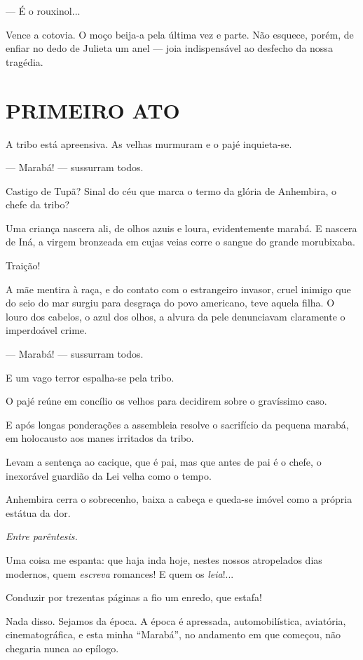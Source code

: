 --- É o rouxinol...

Vence a cotovia. O moço beija-a pela última vez e parte. Não esquece,
porém, de enfiar no dedo de Julieta um anel --- joia indispensável ao
desfecho da nossa tragédia.

\section{PRIMEIRO ATO}

A tribo está apreensiva. As velhas murmuram e o pajé inquieta-se.

--- Marabá! --- sussurram todos.

Castigo de Tupã? Sinal do céu que marca o termo da glória de Anhembira,
o chefe da tribo?

Uma criança nascera ali, de olhos azuis e loura, evidentemente marabá. E
nascera de Iná, a virgem bronzeada em cujas veias corre o sangue do
grande morubixaba.

Traição!

A mãe mentira à raça, e do contato com o estrangeiro invasor, cruel
inimigo que do seio do mar surgiu para desgraça do povo americano, teve
aquela filha. O louro dos cabelos, o azul dos olhos, a alvura da pele
denunciavam claramente o imperdoável crime.

--- Marabá! --- sussurram todos.

E um vago terror espalha-se pela tribo.

O pajé reúne em concílio os velhos para decidirem sobre o gravíssimo
caso.

E após longas ponderações a assembleia resolve o sacrifício da pequena
marabá, em holocausto aos manes irritados da tribo.

Levam a sentença ao cacique, que é pai, mas que antes de pai é o chefe,
o inexorável guardião da Lei velha como o tempo.

Anhembira cerra o sobrecenho, baixa a cabeça e queda-se imóvel como a
própria estátua da dor.

\emph{Entre parêntesis.}

Uma coisa me espanta: que haja inda hoje, nestes nossos atropelados dias
modernos, quem \emph{escreva} romances! E quem os \emph{leia}!...

Conduzir por trezentas páginas a fio um enredo, que estafa!

Nada disso. Sejamos da época. A época é apressada, automobilística,
aviatória, cinematográfica, e esta minha ``Marabá'', no andamento em que
começou, não chegaria nunca ao epílogo.

